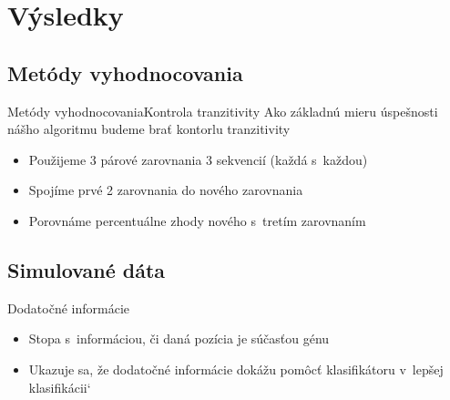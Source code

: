 \documentclass[xcolor=dvipsnames, compress, 12pt, t]{beamer}
\begin{document}


\section{Výsledky}
\subsection{Metódy vyhodnocovania}
\begin{frame}{Metódy vyhodnocovania}{Kontrola tranzitivity}
Ako základnú mieru úspešnosti nášho algoritmu budeme brať kontorlu tranzitivity
  \begin{itemize}
    \item Použijeme 3 párové zarovnania 3 sekvencií (každá s~každou)
    \item Spojíme prvé 2 zarovnania do nového zarovnania
    \item Porovnáme percentuálne zhody nového s~tretím zarovnaním
  \end{itemize}
\end{frame}

\subsection{Simulované dáta}
\begin{frame}{Dodatočné informácie}
  \begin{itemize}
    \item Stopa s~informáciou, či daná pozícia je súčasťou génu
    \item Ukazuje sa, že dodatočné informácie dokážu pomôcť klasifikátoru v~lepšej klasifikácii`
  \end{itemize}
\end{frame}
\end{document}
